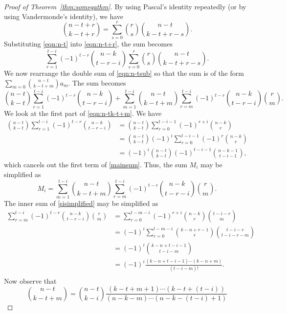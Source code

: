 \documentclass[12pt]{article}
\theoremstyle{definition}
\theoremstyle{remark}
\begin{document}
\begin{proof}[Proof of Theorem~\ref{thm:somegathm}]
By using Pascal's identity repeatedly (or by using Vandermonde's identity), we have
\begin{equation}\label{eqn:n-t}
\binom{n-t+r}{k-t+r} = \sum_{s=0}^{r}\binom{r}{s}\binom{n-t}{k-t+r-s}.
\end{equation}
Substituting \eqref{eqn:n-t} into \eqref{eqn:n-t+r}, the sum becomes 
\begin{equation}\label{eqn:n-tsub}
\sum_{r=1}^{t-i}(-1)^{t-r}\binom{n-k}{t-r-i}\sum_{s=0}^{r}\binom{r}{s}\binom{n-t}{k-t+r-s}.
\end{equation}
We now rearrange the double sum of \eqref{eqn:n-tsub} so that the sum is of the form $\sum_{m=0}\binom{n-t}{k-t+m}a_m$. The sum becomes 
\begin{equation}\label{eqn:n-tk-t+m}
\binom{n-t}{k-t}\sum_{r=1}^{t-i}(-1)^{t-r}\binom{n-k}{t-r-i} + \sum_{m=1}^{t-i}\binom{n-t}{k-t+m} \sum_{r=m}^{t-i}(-1)^{t-r}\binom{n-k}{t-r-i}\binom{r}{m}.
\end{equation}
We look at the first part of \eqref{eqn:n-tk-t+m}. We have
\begin{align*}
\binom{n-t}{k-t}\sum_{r=1}^{t-i}(-1)^{t-r}\binom{n-k}{t-r-i} 
&= \binom{n-t}{k-t}\sum_{r=0}^{t-i-1}(-1)^{r+i}\binom{n-k}{r}\\
&=\binom{n-t}{k-t}(-1)^{i}\sum_{r=0}^{t-i-1}(-1)^r\binom{n-k}{r}\\
&=(-1)^{i}\binom{n-t}{k-t}(-1)^{t-i-1}\binom{n-k-1}{t-i-1},
\end{align*}
which cancels out the first term of \eqref{mainsum}. Thus, the sum $M_i$ may be simplified as
\begin{equation}\label{sisimplified}
M_i = \sum_{m=1}^{t-i}\binom{n-t}{k-t+m} \sum_{r=m}^{t-i}(-1)^{t-r}\binom{n-k}{t-r-i}\binom{r}{m}.
\end{equation}
The inner sum of \eqref{sisimplified} may be simplified as 
\begin{align*}
\sum_{r=m}^{t-i}(-1)^{t-r}\binom{n-k}{t-r-i}\binom{r}{m} &= \sum_{r=0}^{t-m-i}(-1)^{r+i}\binom{n-k}{r}\binom{t-i-r}{m}\\
&= (-1)^i\sum_{r=0}^{t-m-i}\binom{k-n+r-1}{r}\binom{t-i-r}{t-i-r-m}\\
&=(-1)^i\binom{k-n+t-i-1}{t-i-m}\\ &= (-1)^i \frac{(k-n+t-i-1)\cdots (k-n+m)}{(t-i-m)!}.\\
\end{align*}
Now observe that 
\begin{equation}\label{eqn:n-tk-i}
\binom{n-t}{k-t+m} = \binom{n-t}{k-i} \frac{(k-t+m+1)\cdots(k-t+(t-i))}{(n-k-m)\cdots(n-k-(t-i)+1)}
\end{equation}


\end{proof}
\end{document}

